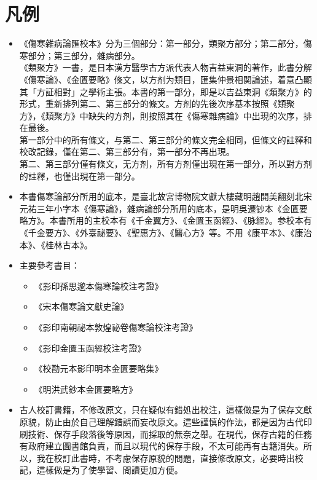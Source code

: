 

\frontmatter
\maketitle
\tableofcontents

\chapter{凡例}

\begin{itemize}
	
	\item 《傷寒雜病論匯校本》分为三個部分：第一部分，類聚方部分；第二部分，傷寒部分；第三部分，雜病部分。\\
	《類聚方》一書，是日本漢方醫學古方派代表人物吉益東洞的著作，此書分解《傷寒論》、《金匱要略》條文，以方剂为類目，匯集仲景相関論述，着意凸顯其「方証相對」之學術主張。本書的第一部分，即是以吉益東洞《類聚方》的形式，重新排列第二、第三部分的條文。方剂的先後次序基本按照《類聚方》，《類聚方》中缺失的方剂，則按照其在《傷寒雜病論》中出現的次序，排在最後。\\
	第一部分中的所有條文，与第二、第三部分的條文完全相同，但條文的註釋和校改記錄，僅在第二、第三部分有，第一部分不再出現。\\
	第二、第三部分僅有條文，无方剂，所有方剂僅出現在第一部分，所以對方剂的註釋，也僅出現在第一部分。
	
	\item 本書傷寒論部分所用的底本，是臺北故宮博物院文獻大樓藏明趙開美翻刻北宋元祐三年小字本《傷寒論》，雜病論部分所用的底本，是明吳遷钞本《金匱要略方》。本書所用的主校本有《千金翼方》、《金匱玉函經》、《脉經》。参校本有《千金要方》、《外臺祕要》、《聖惠方》、《醫心方》等。不用《康平本》、《康治本》、《桂林古本》。
	
	\item 主要參考書目：
		\begin{itemize}
			\item 《影印孫思邈本傷寒論校注考證》
			\item 《宋本傷寒論文獻史論》
			\item 《影印南朝祕本敦煌祕卷傷寒論校注考證》
			\item 《影印金匱玉函經校注考證》
			\item 《校勘元本影印明本金匱要略集》
			\item 《明洪武鈔本金匱要略方》
		\end{itemize}

	\item 古人校訂書籍，不修改原文，只在疑似有錯処出校注，這樣做是为了保存文獻原貌，防止由於自己理解錯誤而妄改原文。這些謹慎的作法，都是因为古代印刷技術、保存手段落後等原因，而採取的無奈之舉。在現代，保存古籍的任務有政府建立圖書館負責，而且以現代的保存手段，不太可能再有古籍消失。所以，我在校訂此書時，不考慮保存原貌的問題，直接修改原文，必要時出校記，這樣做是为了使學習、閲讀更加方便。
	

\end{itemize}
